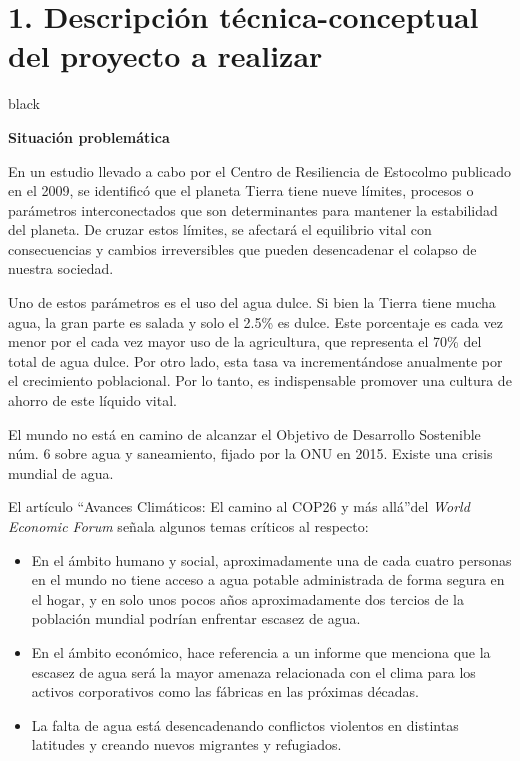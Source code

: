 \documentclass[
11pt, %
codirector, %
]{charter}
\begin{document}
\section{1. Descripción técnica-conceptual del proyecto a realizar}
\label{sec:descripcion}


\begin{consigna}{black} %

\textbf{Situación problemática} 

En un estudio llevado a cabo por el Centro de Resiliencia de Estocolmo publicado en el 2009, se identificó que el planeta Tierra tiene nueve límites, procesos o parámetros interconectados que son determinantes para mantener la estabilidad del planeta. De cruzar estos límites, se afectará el equilibrio vital con consecuencias y cambios irreversibles que pueden desencadenar el colapso de nuestra sociedad.

Uno de estos parámetros es el uso del agua dulce. Si bien la Tierra tiene mucha agua, la gran parte es salada y solo el 2.5\% es dulce. Este porcentaje es cada vez menor por el cada vez mayor uso de la agricultura, que representa el 70\% del total de agua dulce. Por otro lado, esta tasa va incrementándose anualmente por el crecimiento poblacional. Por lo tanto, es indispensable promover una cultura de ahorro de este líquido vital.

El mundo no está en camino de alcanzar el Objetivo de Desarrollo Sostenible núm. 6 sobre agua y saneamiento, fijado por la ONU en 2015. Existe una crisis mundial de agua.

El artículo \textquotedblleft{Avances Climáticos: El camino al COP26 y más allá}\textquotedblright del \textit{World Economic Forum} señala algunos temas críticos al respecto:
\begin{itemize}
	\item En el ámbito humano y social, aproximadamente una de cada cuatro personas en el mundo no tiene acceso a agua potable administrada de forma segura en el hogar, y en solo unos pocos años aproximadamente dos tercios de la población mundial podrían enfrentar escasez de agua.
	\item En el ámbito económico, hace referencia a un informe que menciona que la escasez de agua será la mayor amenaza relacionada con el clima para los activos corporativos como las fábricas en las próximas décadas.
	\item La falta de agua está desencadenando conflictos violentos en distintas latitudes y creando nuevos migrantes y refugiados.
\end{itemize}


\end{consigna}
\end{document}
